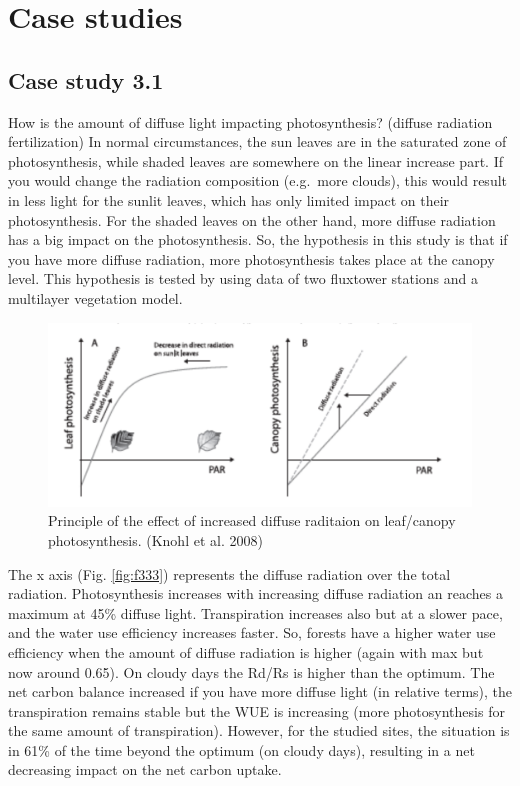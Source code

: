 \documentclass[
  12pt,
  oneside]{book}
\begin{document}
\hypertarget{case-studies-1}{%
\section{Case studies}\label{case-studies-1}}

\hypertarget{case-study-3.1}{%
\subsection{Case study 3.1}\label{case-study-3.1}}

How is the amount of diffuse light impacting photosynthesis? (diffuse radiation fertilization) In normal circumstances, the sun leaves are in the saturated zone of photosynthesis, while shaded leaves are somewhere on the linear increase part. If you would change the radiation composition (e.g.~more clouds), this would result in less light for the sunlit leaves, which has only limited impact on their photosynthesis. For the shaded leaves on the other hand, more diffuse radiation has a big impact on the photosynthesis. So, the hypothesis in this study is that if you have more diffuse radiation, more photosynthesis takes place at the canopy level. This hypothesis is tested by using data of two fluxtower stations and a multilayer vegetation model.

\begin{figure}

{\centering \includegraphics[width=0.8\linewidth]{figures/chap3/f332_knohl1} 

}

\caption{Principle of the effect of increased diffuse raditaion on leaf/canopy photosynthesis. (Knohl et al. 2008)}\label{fig:f332}
\end{figure}

The x axis (Fig. \ref{fig:f333}) represents the diffuse radiation over the total radiation. Photosynthesis increases with increasing diffuse radiation an reaches a maximum at 45\% diffuse light. Transpiration increases also but at a slower pace, and the water use efficiency increases faster. So, forests have a higher water use efficiency when the amount of diffuse radiation is higher (again with max but now around 0.65). On cloudy days the Rd/Rs is higher than the optimum. The net carbon balance increased if you have more diffuse light (in relative terms), the transpiration remains stable but the WUE is increasing (more photosynthesis for the same amount of transpiration). However, for the studied sites, the situation is in 61\% of the time beyond the optimum (on cloudy days), resulting in a net decreasing impact on the net carbon uptake.
\end{document}
